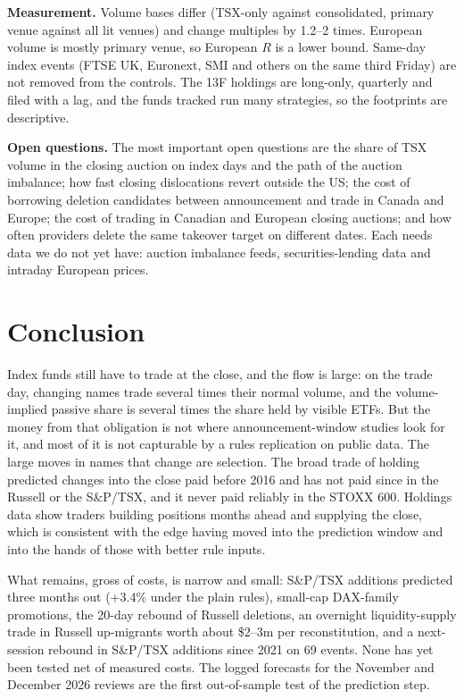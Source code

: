 \documentclass[10pt, a4paper, twocolumn]{article}
\begin{document}
\textbf{Measurement.} Volume bases differ (TSX-only against consolidated, primary venue against all lit venues) and change multiples by 1.2--2 times. European volume is mostly primary venue, so European $R$ is a lower bound. Same-day index events (FTSE UK, Euronext, SMI and others on the same third Friday) are not removed from the controls. The 13F holdings are long-only, quarterly and filed with a lag, and the funds tracked run many strategies, so the footprints are descriptive.

\textbf{Open questions.} The most important open questions are the share of TSX volume in the closing auction on index days and the path of the auction imbalance; how fast closing dislocations revert outside the US; the cost of borrowing deletion candidates between announcement and trade in Canada and Europe; the cost of trading in Canadian and European closing auctions; and how often providers delete the same takeover target on different dates. Each needs data we do not yet have: auction imbalance feeds, securities-lending data and intraday European prices.

\section{Conclusion}
\label{sec:conclusion}

Index funds still have to trade at the close, and the flow is large: on the trade day, changing names trade several times their normal volume, and the volume-implied passive share is several times the share held by visible ETFs. But the money from that obligation is not where announcement-window studies look for it, and most of it is not capturable by a rules replication on public data. The large moves in names that change are selection. The broad trade of holding predicted changes into the close paid before 2016 and has not paid since in the Russell or the S\&P/TSX, and it never paid reliably in the STOXX 600. Holdings data show traders building positions months ahead and supplying the close, which is consistent with the edge having moved into the prediction window and into the hands of those with better rule inputs.

What remains, gross of costs, is narrow and small: S\&P/TSX additions predicted three months out (+3.4\% under the plain rules), small-cap DAX-family promotions, the 20-day rebound of Russell deletions, an overnight liquidity-supply trade in Russell up-migrants worth about \$2--3m per reconstitution, and a next-session rebound in S\&P/TSX additions since 2021 on 69 events. None has yet been tested net of measured costs. The logged forecasts for the November and December 2026 reviews are the first out-of-sample test of the prediction step.
\end{document}
